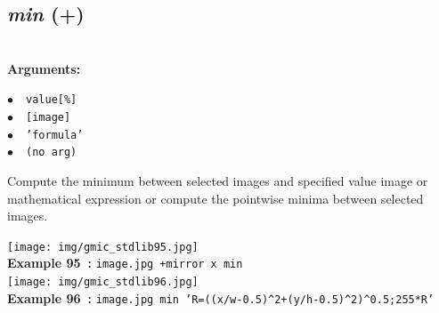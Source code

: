 \documentclass[a4paper,10.5pt,twoside]{book}
\def\comma{\discretionary{,}{}{,}}
\newcommand{\Cb}[1]{\textcolor{cb}{#1}}
\begin{document}
\subsection{\emph{min} (+)}\vspace*{-0.7em}
~\\\textbf{\Cb{Arguments: }}\begin{flushleft}
{\small \Cb{\hspace*{0.5cm}$\bullet$~~\texttt{value[\%]}}}~~~\\
{\small \Cb{\hspace*{0.5cm}$\bullet$~~\texttt{[image]}}}~~~\\
{\small \Cb{\hspace*{0.5cm}$\bullet$~~\texttt{'formula'}}}~~~\\
{\small \Cb{\hspace*{0.5cm}$\bullet$~~\texttt{(no arg)}}}\end{flushleft}
Compute the minimum between selected images and specified value{\comma} image or
mathematical expression{\comma} or compute the pointwise minima between selected images.
\begin{center}\texttt{[image: img/gmic\_stdlib95.jpg]}\\
{\footnotesize \textbf{Example 95~:} \texttt{image.jpg +mirror x min}}
\\\texttt{[image: img/gmic\_stdlib96.jpg]}\\
{\footnotesize \textbf{Example 96~:} \texttt{image.jpg min 'R=((x/w-0.5)\textasciicircum 2+(y/h-0.5)\textasciicircum 2)\textasciicircum 0.5;255*R'}}
\end{center}
\end{document}
